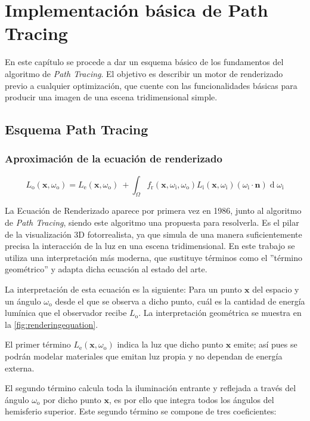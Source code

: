 \chapter{Implementación básica de Path Tracing}
	
En este capítulo se procede a dar un esquema básico de los fundamentos del algoritmo de \emph{Path Tracing}. El objetivo es describir un motor de renderizado previo a cualquier optimización, que cuente con las funcionalidades básicas para producir una imagen de una escena tridimensional simple.


\section{Esquema Path Tracing}
\label{pathtracingexplanation}


	\subsection{Aproximación de la ecuación de renderizado}
\[
{\displaystyle L_{\text{o}}(\mathbf {x} ,\omega _{\text{o}})=L_{\text{e}}(\mathbf {x} ,\omega _{\text{o}})\ +\int _{\Omega }f_{\text{r}}(\mathbf {x} ,\omega _{\text{i}},\omega _{\text{o}})L_{\text{i}}(\mathbf {x} ,\omega _{\text{i}})(\omega _{\text{i}}\cdot \mathbf {n} )\operatorname {d} \omega _{\text{i}}}
\]

La Ecuación de Renderizado \cite{kajiya1986rendering} aparece por primera vez en 1986, junto al algoritmo de \emph{Path Tracing}, siendo este algoritmo una propuesta para resolverla. Es el pilar de la visualización 3D fotorrealista, ya que simula de una manera suficientemente precisa la interacción de la luz en una escena tridimensional. En este trabajo se utiliza una interpretación más moderna, que sustituye términos como el ''término geométrico'' y adapta dicha ecuación al estado del arte.

La interpretación de esta ecuación es la siguiente: Para un punto $\mathbf {x}$ del espacio y un ángulo $\omega _{\text{o}}$ desde el que se observa a dicho punto, cuál es la cantidad de energía lumínica que el observador recibe $L_{\text{o}}$. La interpretación geométrica se muestra en la \autoref{fig:renderingequation}.

El primer término $L_{\text{e}}(\mathbf {x} ,\omega _{\text{o}})$ indica la luz que dicho punto $\mathbf {x}$ emite; así pues se podrán modelar materiales que emitan luz propia y no dependan de energía externa.

El segundo término calcula toda la iluminación entrante y reflejada a través del ángulo $\omega _{\text{o}}$ por dicho punto $\mathbf {x}$, es por ello que integra todos los ángulos del hemisferio superior. Este segundo término se compone de tres coeficientes:

